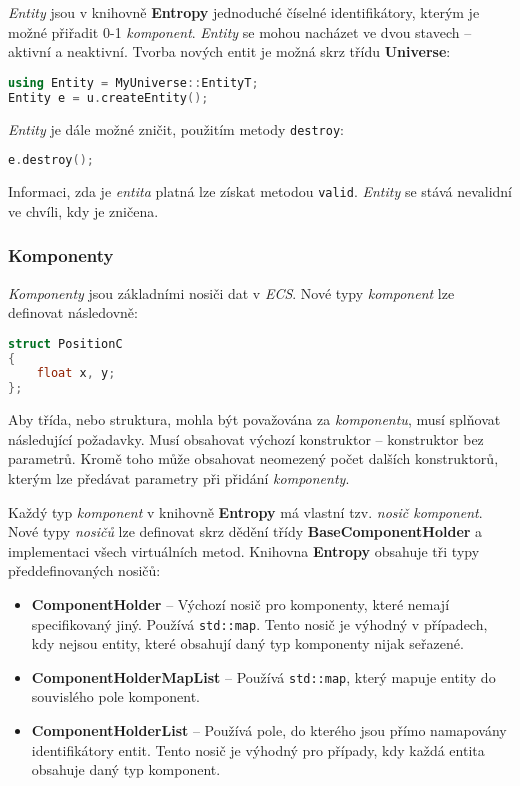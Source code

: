 \emph{Entity} jsou v knihovně \textbf{Entropy} jednoduché číselné identifikátory, kterým je možné přiřadit 0-1 \emph{komponent}. \emph{Entity} se mohou nacházet ve dvou stavech -- aktivní a neaktivní. Tvorba nových entit je možná skrz třídu \textbf{Universe}:

\begin{lstlisting}[backgroundcolor = \color{lightgray}, language = C++, xleftmargin = 2cm, framexleftmargin = 1em, tabsize=4]
using Entity = MyUniverse::EntityT;
Entity e = u.createEntity();
\end{lstlisting}

\noindent \emph{Entity} je dále možné zničit, použitím metody \texttt{destroy}:
\begin{lstlisting}[backgroundcolor = \color{lightgray}, language = C++, xleftmargin = 2cm, framexleftmargin = 1em, tabsize=4]
e.destroy();
\end{lstlisting}

\noindent Informaci, zda je \emph{entita} platná lze získat metodou \texttt{valid}. \emph{Entity} se stává nevalidní ve chvíli, kdy je zničena.

\subsubsection*{Komponenty}

\emph{Komponenty} jsou základními nosiči dat v \emph{ECS}. Nové typy \emph{komponent} lze definovat následovně:

\begin{lstlisting}[backgroundcolor = \color{lightgray}, language = C++, xleftmargin = 2cm, framexleftmargin = 1em, tabsize=4]
struct PositionC
{
	float x, y;
};
\end{lstlisting}

\noindent Aby třída, nebo struktura, mohla být považována za \emph{komponentu}, musí splňovat následující požadavky. Musí obsahovat výchozí konstruktor -- konstruktor bez parametrů. Kromě toho může obsahovat neomezený počet dalších konstruktorů, kterým lze předávat parametry při přidání \emph{komponenty}. 

Každý typ \emph{komponent} v knihovně \textbf{Entropy} má vlastní tzv. \emph{nosič komponent}. Nové typy \emph{nosičů} lze definovat skrz dědění třídy \textbf{BaseComponentHolder} a implementaci všech virtuálních metod. Knihovna \textbf{Entropy} obsahuje tři typy předdefinovaných nosičů:

\begin{itemize}
	\item \textbf{ComponentHolder} -- Výchozí nosič pro komponenty, které nemají specifikovaný jiný. Používá \texttt{std::map}. Tento nosič je výhodný v případech, kdy nejsou entity, které obsahují daný typ komponenty nijak seřazené.
	\item \textbf{ComponentHolderMapList} -- Používá \texttt{std::map}, který mapuje entity do souvislého pole komponent.
	\item \textbf{ComponentHolderList} -- Používá pole, do kterého jsou přímo namapovány identifikátory entit. Tento nosič je výhodný pro případy, kdy každá entita obsahuje daný typ komponent.
\end{itemize}

